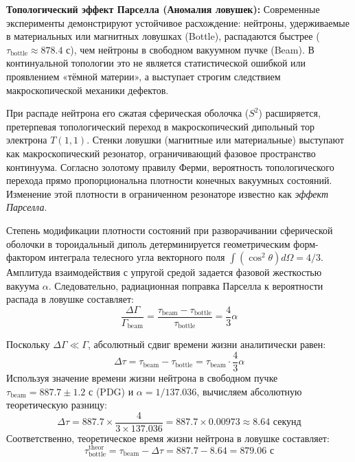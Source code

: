 \documentclass[12pt,a4paper]{article}
\begin{document}
	\textbf{Топологический эффект Парселла (Аномалия ловушек):}
	Современные эксперименты демонстрируют устойчивое расхождение: нейтроны, удерживаемые в материальных или магнитных ловушках (Bottle), распадаются быстрее ($\tau_{\text{bottle}} \approx 878.4$ с), чем нейтроны в свободном вакуумном пучке (Beam). В континуальной топологии это не является статистической ошибкой или проявлением «тёмной материи», а выступает строгим следствием макроскопической механики дефектов.
	
	При распаде нейтрона его сжатая сферическая оболочка ($S^2$) расширяется, претерпевая топологический переход в макроскопический дипольный тор электрона $T(1,1)$. 
	Стенки ловушки (магнитные или материальные) выступают как макроскопический резонатор, ограничивающий фазовое пространство континуума. Согласно золотому правилу Ферми, вероятность топологического перехода прямо пропорциональна плотности конечных вакуумных состояний. Изменение этой плотности в ограниченном резонаторе известно как \textit{эффект Парселла}.
	
	Степень модификации плотности состояний при разворачивании сферической оболочки в тороидальный диполь детерминируется геометрическим форм-фактором интеграла телесного угла векторного поля $\int (\cos^2\theta) d\Omega = 4/3$. Амплитуда взаимодействия с упругой средой задается фазовой жесткостью вакуума $\alpha$. Следовательно, радиационная поправка Парселла к вероятности распада в ловушке составляет:
	\begin{equation}
		\frac{\Delta \Gamma}{\Gamma_{\text{beam}}} = \frac{\tau_{\text{beam}} - \tau_{\text{bottle}}}{\tau_{\text{bottle}}} = \frac{4}{3} \alpha
	\end{equation}
	
	Поскольку $\Delta \Gamma \ll \Gamma$, абсолютный сдвиг времени жизни аналитически равен:
	\begin{equation}
		\Delta \tau = \tau_{\text{beam}} - \tau_{\text{bottle}} = \tau_{\text{beam}} \cdot \frac{4}{3} \alpha
	\end{equation}
	Используя значение времени жизни нейтрона в свободном пучке $\tau_{\text{beam}} = 887.7 \pm 1.2$ с (PDG) и $\alpha = 1/137.036$, вычисляем абсолютную теоретическую разницу:
	\begin{equation}
		\Delta \tau = 887.7 \times \frac{4}{3 \times 137.036} = 887.7 \times 0.00973 \approx \mathbf{8.64 \text{ секунд}}
	\end{equation}
	Соответственно, теоретическое время жизни нейтрона в ловушке составляет:
	\begin{equation}
		\tau_{\text{bottle}}^{\text{theor}} = \tau_{\text{beam}} - \Delta\tau = 887.7 - 8.64 = \mathbf{879.06 \text{ с}}
	\end{equation}
	
\end{document}

